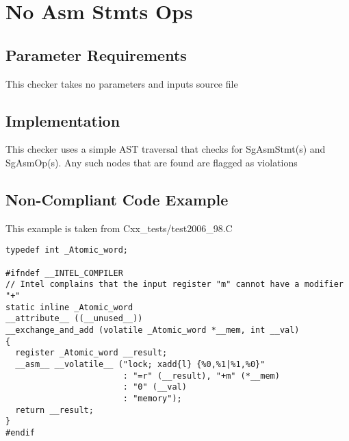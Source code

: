 %
%

\section{No Asm Stmts Ops}
\label{NoAsmStmtsOps::overview}


\subsection{Parameter Requirements}
This checker takes no parameters and inputs source file

\subsection{Implementation}
This checker uses a simple AST traversal that checks for SgAsmStmt(s) and SgAsmOp(s). Any such nodes that are found are flagged as violations

\subsection{Non-Compliant Code Example}
This example is taken from Cxx\_tests/test2006\_98.C
\begin{verbatim}
typedef int _Atomic_word;

#ifndef __INTEL_COMPILER
// Intel complains that the input register "m" cannot have a modifier "+"
static inline _Atomic_word
__attribute__ ((__unused__))
__exchange_and_add (volatile _Atomic_word *__mem, int __val)
{
  register _Atomic_word __result;
  __asm__ __volatile__ ("lock; xadd{l} {%0,%1|%1,%0}"
                        : "=r" (__result), "+m" (*__mem)
                        : "0" (__val)
                        : "memory");
  return __result;
}
#endif
\end{verbatim}

